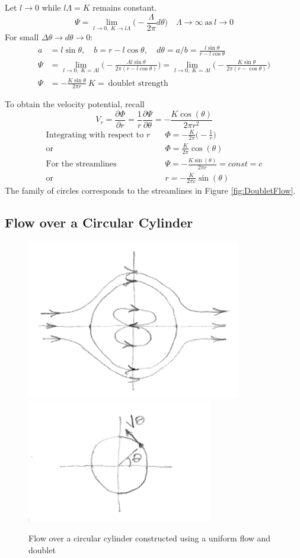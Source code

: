 \documentclass[draft=false, titlepage]{article}
\newcommand{\partialfrac}[2]{\frac{\partial #1}{\partial #2}}
\begin{document}
Let $l\rightarrow 0$ while $l\Lambda = K$ remains constant.
\begin{equation*}
    \Psi = \lim\limits_{l\rightarrow 0,\ K \rightarrow l\Lambda} \Big(-\frac{\Lambda}{2\pi} d\theta \Big) \quad \Lambda \rightarrow \infty\ \text{as}\ l \rightarrow 0
\end{equation*}
For small $\Delta \theta \rightarrow d\theta \rightarrow 0$:
\begin{align*}
    a &= l\sin\theta, \quad
    b = r - l\cos\theta, \quad
    d\theta = a/b = \frac{l\sin\theta}{r-l\cos\theta}\\
    \Psi &= \lim\limits_{l\rightarrow 0,\ K = \Lambda l} \Big( -\frac{\Lambda l \sin\theta}{2\pi (r-l\cos\theta)} \Big) =
    \lim\limits_{l\rightarrow 0,\ K = \Lambda l} \Big( -\frac{K\sin\theta}{2\pi(r-\cos\theta)} \Big) \\
    \Psi &= -\frac{K\sin\theta}{2\pi r}\ K =\ \text{doublet strength}
\end{align*}

To obtain the velocity potential, recall
\begin{equation*}
    V_r = \partialfrac{\Phi}{r} = \frac{1}{r}\partialfrac{\Psi}{\theta} = -\frac{K\cos(\theta)}{2\pi r^2}
\end{equation*}
\begin{align*}
    \text{Integrating with respect to } r\quad & \Phi = -\frac{K}{2\pi}\big(-\frac{1}{r}\big)\\
    \text{or}\quad & \Phi = \frac{K}{2\pi}\cos(\theta)\\
    \text{For the streamlines}\quad & \Psi = -\frac{K\sin(\theta)}{2\pi r} = const = c\\
    \text{or}\quad & r =-\frac{K}{2\pi c}\sin(\theta)
\end{align*}
The family of circles corresponds to the streamlines in Figure \ref{fig:DoubletFlow}.

\subsection{Flow over a Circular Cylinder}
\begin{figure}[ht]
    \centering
    \includegraphics[width=0.3\linewidth]{Figures/flowCircularCylinder.PNG}
    \includegraphics[width=0.3\linewidth]{Figures/flowCircularCylinder2.PNG}
    \caption{Flow over a circular cylinder constructed using a uniform flow and doublet}
    \label{fig:FlowCircularCylinder}
\end{figure}
\end{document}
